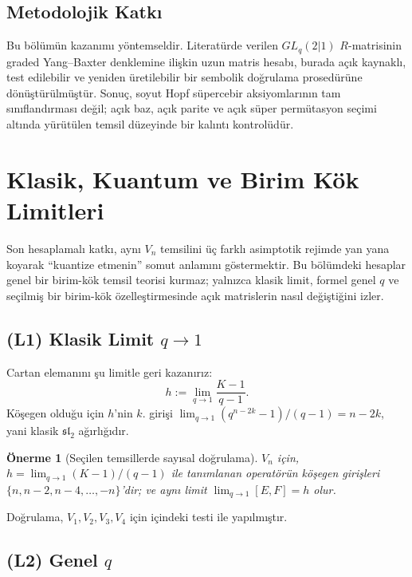 \documentclass[10pt]{math}
\numberwithin{equation}{section}
\theoremstyle{plain}
\newtheorem{proposition}[theorem]{Önerme}
\theoremstyle{definition}
\renewcommand{\sl}{\mathfrak{sl}}
\begin{document}
\subsection{Metodolojik Katkı}

Bu bölümün kazanımı yöntemseldir. Literatürde verilen $GL_q(2|1)$
$R$-matrisinin graded Yang--Baxter denklemine ilişkin uzun matris hesabı,
burada açık kaynaklı, test edilebilir ve yeniden üretilebilir bir sembolik
doğrulama prosedürüne dönüştürülmüştür. Sonuç, soyut Hopf süpercebir
aksiyomlarının tam sınıflandırması değil; açık baz, açık parite ve açık
süper permütasyon seçimi altında yürütülen temsil düzeyinde bir kalıntı
kontrolüdür.

\section{Klasik, Kuantum ve Birim Kök Limitleri}\label{sec:limits}

Son hesaplamalı katkı, aynı $V_n$ temsilini üç farklı asimptotik rejimde yan
yana koyarak ``kuantize etmenin'' somut anlamını göstermektir. Bu bölümdeki
hesaplar genel bir birim-kök temsil teorisi kurmaz; yalnızca klasik limit,
formel genel $q$ ve seçilmiş bir birim-kök özelleştirmesinde açık matrislerin
nasıl değiştiğini izler.

\subsection{(L1) Klasik Limit $q \to 1$}

Cartan elemanını şu limitle geri kazanırız:
\[
  h := \lim_{q \to 1} \frac{K - 1}{q - 1}.
\]
Köşegen olduğu için $h$'nin $k$. girişi
$\lim_{q \to 1} (q^{n-2k} - 1)/(q - 1) = n - 2k$, yani klasik
$\sl_2$ ağırlığıdır.

\begin{proposition}[Seçilen temsillerde sayısal doğrulama]\label{thm:classical}
$V_n$ için, $h = \lim_{q\to 1} (K-1)/(q-1)$ ile tanımlanan operatörün
köşegen girişleri $\{n, n-2, n-4, \dots, -n\}$'dir; ve aynı limit
$\lim_{q\to 1} [E,F] = h$ olur.
\end{proposition}

Doğrulama, $V_1, V_2, V_3, V_4$ için 
içindeki  testi ile
yapılmıştır.

\subsection{(L2) Genel $q$}
\end{document}
